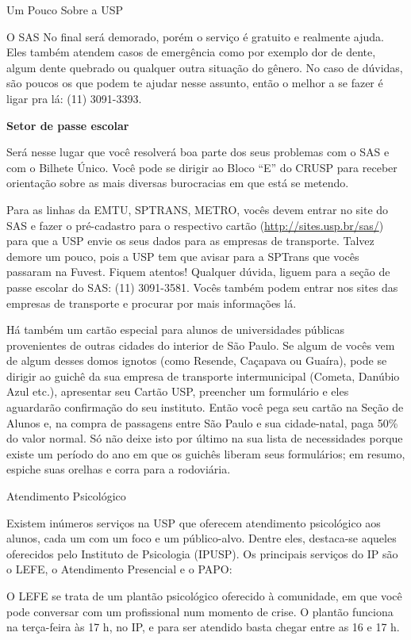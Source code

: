 \begin{secao}{Um Pouco Sobre a USP}
\begin{subsecao}{O SAS}
No final será demorado, porém o serviço é gratuito e realmente ajuda. Eles também atendem casos
de emergência como por exemplo dor de dente, algum dente quebrado ou qualquer outra situação
do gênero. No caso de dúvidas, são poucos os que podem te ajudar nesse assunto, então o melhor
a se fazer é ligar pra lá: (11) 3091-3393.

\textbf{Setor de passe escolar}

Será nesse lugar que você resolverá boa parte dos seus problemas com o SAS e com o
Bilhete Único. Você pode se dirigir ao Bloco “E” do CRUSP para receber orientação sobre
as mais diversas burocracias em que está se metendo.

Para as linhas da EMTU, SPTRANS, METRO, vocês devem entrar no site do SAS e fazer
o pré-cadastro para o respectivo cartão (\url {http://sites.usp.br/sas/}) para que a USP envie os 
seus dados para as empresas de transporte. Talvez demore um pouco, pois a USP tem que
avisar para a SPTrans que vocês passaram na Fuvest. Fiquem atentos! Qualquer dúvida,
liguem para a seção de passe escolar do SAS: (11) 3091-3581. Vocês também podem entrar nos sites 
das empresas de transporte e procurar por mais informações lá.

Há também um cartão especial para alunos de universidades públicas provenientes
de outras cidades do interior de São Paulo. Se algum de vocês vem de algum desses domos
ignotos (como Resende, Caçapava ou Guaíra), pode se dirigir ao guichê da sua empresa de
transporte intermunicipal (Cometa, Danúbio Azul etc.), apresentar seu Cartão USP,
preencher um formulário e eles aguardarão confirmação do seu instituto. Então
você pega seu cartão na Seção de Alunos e, na compra de passagens entre São Paulo
e sua cidade-natal, paga 50\% do valor normal. Só não deixe isto por último na
sua lista de necessidades porque existe um período do ano em que os guichês
liberam seus formulários; em resumo, espiche suas orelhas e corra para a rodoviária.

\end{subsecao}

\begin{subsecao}{Atendimento Psicológico}

Existem inúmeros serviços na USP que oferecem atendimento psicológico
aos alunos, cada um com um foco e um público-alvo. Dentre eles, destaca-se 
aqueles oferecidos pelo Instituto de Psicologia (IPUSP).
Os principais serviços do IP são o LEFE, o Atendimento Presencial e o PAPO:

O LEFE se trata de um plantão psicológico oferecido à comunidade, em que
você pode conversar com um profissional num momento de crise. O plantão 
funciona na terça-feira às 17 h, no IP, e para ser atendido basta chegar 
entre as 16 e 17 h.


\end{subsecao}
\end{secao}
